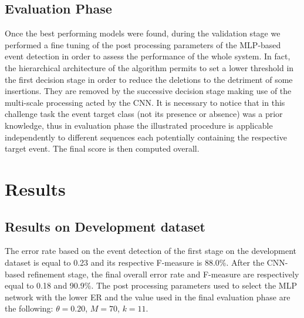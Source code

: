 \documentclass{article}
\begin{document}
\begin{sloppy}
\subsection{Evaluation Phase}
Once the best performing models were found, during the validation stage we performed a fine tuning of the post processing parameters of the MLP-based event detection in order to assess the performance of the whole system. In fact, the hierarchical architecture of the algorithm permits to set a lower threshold in the first decision stage in order to reduce the deletions to the detriment of some insertions. They are removed by the successive decision stage making use of the multi-scale processing acted by the CNN. 
It is necessary to notice that in this challenge task the event target class (not its presence or absence) was a prior knowledge, thus in evaluation phase the illustrated procedure is applicable independently to different sequences each potentially containing the respective target event. The final score is then computed overall.

\section{Results}
\label{sec:results}
\subsection{Results on Development dataset}
The error rate based on the event detection of the first stage on the development dataset is equal to 0.23 and its respective F-measure is 88.0\%. 
After the CNN-based refinement stage, the final overall error rate and F-measure are respectively equal to 0.18 and 90.9\%. 
The post processing parameters used to select the MLP network with the lower ER and the value used in the final evaluation phase are the following:
$\theta=0.20$, $M=70$, $k=11$. 


\end{sloppy}
\end{document}
